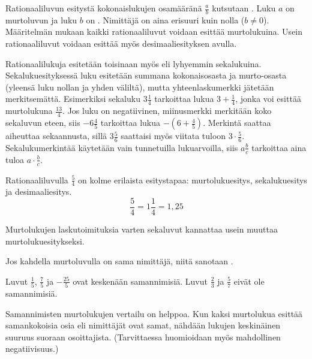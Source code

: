 Rationaaliluvun esitystä kokonaislukujen osamääränä
$\frac{a}{b}$ kutsutaan . Luku $a$ on murtoluvun
 ja luku $b$ on . Nimittäjä on aina erisuuri kuin nolla ($b\neq0 $). Määritelmän mukaan kaikki rationaaliluvut voidaan esittää murtolukuina. Usein rationaaliluvut voidaan esittää myös desimaaliesityksen avulla. %

Rationaalilukuja esitetään toisinaan myös  eli lyhyemmin
sekalukuina. Sekalukuesityksessä luku esitetään summana kokonaisosasta ja murto-osasta (yleensä luku nollan
ja yhden väliltä), mutta yhteenlaskumerkki jätetään merkitsemättä. Esimerkiksi sekaluku $3\frac{1}{4}$
tarkoittaa lukua $3 + \frac{1}{4}$, jonka voi esittää murtolukuna $\frac{13}{4}$. Jos luku on negatiivinen,
miinusmerkki merkitään koko sekaluvun eteen, siis $-6\frac{4}{5}$ tarkoittaa lukua $-(6 + \frac{4}{5})$.
Merkintä saattaa aiheuttaa sekaannusta, sillä $3\frac{5}{6}$ saattaisi myös viitata tuloon
$3\cdot \frac{5}{6}$. Sekalukumerkintää käytetään vain tunnetuilla lukuarvoilla, siis $a\frac{b}{c}$ tarkoittaa aina
tuloa $a\cdot \frac{b}{c}$. 

\begin{esimerkki}
        Rationaaliluvulla $\frac{5}{4}$ on kolme erilaista esitystapaa: murtolukuesitys, sekalukuesitys ja desimaaliesitys.
        \[\frac{5}{4} = 1\frac{1}{4}=1,25 \]
    \end{esimerkki} %

Murtolukujen laskutoimituksia varten sekaluvut kannattaa usein muuttaa murtolukuesitykseksi. 
\newpage

Jos kahdella murtoluvulla on sama nimittäjä, niitä sanotaan . %

\begin{esimerkki}
Luvut $\frac15$, $\frac75$ ja $-\frac{25}{5}$ ovat keskenään samannimisiä. Luvut $\frac23$ ja $\frac57$ eivät ole samannimisiä.
\end{esimerkki}

Samannimisten murtolukujen vertailu on helppoa. Kun kaksi murtolukua esittää samankokoisia osia eli nimittäjät ovat samat, nähdään lukujen keskinäinen suuruus suoraan osoittajista. (Tarvittaessa huomioidaan myös mahdollinen negatiivisuus.)


